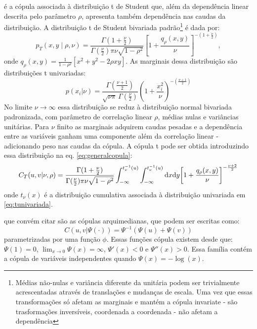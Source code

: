  é a cópula associada à distribuição t de Student que, além da dependência linear descrita pelo parâmetro $\rho$, apresenta também dependência nas caudas da distribuição. A distribuição t de Student bivariada padrão\footnote{Médias não-nulas e variância diferente da unitária podem ser trivialmente acrescentadas através de translações e mudanças de escala. Uma vez que essas transformações só afetam as marginais e mantém a cópula invariate - são trasformações inversíveis, coordenada a coordenada - não afetam a dependência} é dada por:
\begin{equation}
\label{eq:tbivariada}
p_{T}(x,y\mid  \rho, \nu) = \frac{\Gamma(1+\frac{\nu}{2})}{\Gamma(\frac{\nu}{2}){\pi\nu\sqrt{1-\rho^2}}}\left[1+ \frac{q_\rho(x,y)}{\nu}\right]^{-(1+\frac{\nu}{2})},
\end{equation}
onde $q_\rho(x,y) = \frac{1}{1-\rho^2}\left[x^2+ y^2 - 2\rho xy\right]$. As marginais dessa distribuição são distribuições t univariadas:
\begin{equation}
\label{eq:tunivariada}
 p(x_i|\nu) = \frac{\Gamma(\frac{\nu+1}{2})} {\sqrt{\nu\pi}\,\Gamma(\frac{\nu}{2})} \left(1+\frac{x_i^2}{\nu} \right)^{-(\frac{\nu+1}{2})}\!
\end{equation}
No limite $\nu \to \infty$ essa distribuição se reduz à distribuição normal bivariada padronizada, com parâmetro de correlação linear $\rho$, médias nulas e variâncias unitárias. Para $\nu$ finito as marginais adquirem caudas pesadas e a dependência entre as variáveis ganham uma componente além da correlação linear - adicionando peso nas caudas da cópula. A cópula t pode ser obtida introduzindo essa distribuição na eq. \eqref{eq:generalcopula}:
\begin{equation}
 \label{eq:tcop}
C_{T}(u,v|\nu, \rho) = \frac{\Gamma(1+\frac{\nu}{2})}{\Gamma(\frac{\nu}{2}){\pi\nu\sqrt{1-\rho^2}}}
\int_{-\infty}^{t_\nu^{-1}(u)} \int_{-\infty}^{t_\nu^{-1}(u)} \ud x \ud y
{\left[1+ \frac{q_{\rho}(x,y)}{\nu}\right]^{-\frac{\nu+2}{2}}}
\end{equation}
onde $t_{\nu}(x)$ é a distribuição cumulativa associada à distribuição univariada em \eqref{eq:tunivariada}.

 que convém citar são as cópulas arquimedianas, que podem ser escritas como:
\begin{equation}
\label{eq:arqcop}
C(u,v | \Psi(\cdot)) = \Psi^{-1}\left(\Psi(u) + \Psi(v)\right)
\end{equation}
parametrizadas por uma função $\phi$. Essas funções cópula existem desde que: $\Psi(1) = 0$, $\lim_{x \to 0}\Psi(x) = \infty$, $\Psi'(x) < 0$ e $\Psi''(x) > 0$. Essa família contém a cópula de variáveis independentes quando $\Psi(x) = -\log(x)$.
